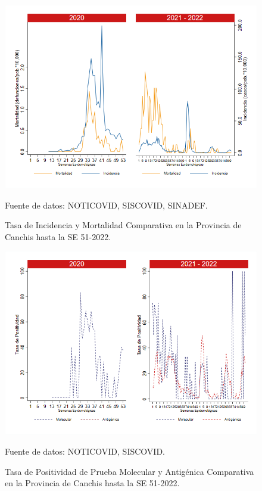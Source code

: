\documentclass[12pt,a4paper,openany]{book}
\begin{document}
	\begin{figure}[h]
		\caption{Tasa de Incidencia y Mortalidad Comparativa en la Provincia de Canchis hasta la SE 51-2022.}\label{fig:inc_mort_canchis}
		\begin{center}
			\includegraphics[width=0.85\linewidth]{../figuras/incidencia_mortalidad_20_21_5.png}
		\end{center}
		{\footnotesize {Fuente de datos: NOTICOVID, SISCOVID, SINADEF.}}
	\end{figure}
	
	\begin{figure}[h]
		\caption{Tasa de Positividad de Prueba Molecular y Antigénica Comparativa en la Provincia de Canchis hasta la SE 51-2022.}\label{fig:positividad_canchis}
		\begin{center}
			\includegraphics[width=0.7\linewidth]{../figuras/positividad_20_21_5.png}
		\end{center}
		{\footnotesize {Fuente de datos: NOTICOVID, SISCOVID.}}
	\end{figure}
	
\end{document}
